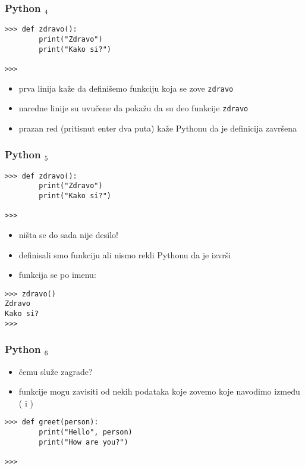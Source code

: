 \documentclass[utf8,compress]{beamer}
\begin{document}
\begin{frame}[fragile]
\frametitle{Python $_4$}
\begin{verbatim}
>>> def zdravo():
        print("Zdravo")
        print("Kako si?")
        
>>>
\end{verbatim}
\begin{itemize}
  \item prva linija kaže da definišemo funkciju koja se zove \texttt{zdravo}
  \item naredne linije su uvučene da pokažu da su deo funkcije \texttt{zdravo}
  \item prazan red (pritisnut enter dva puta) kaže Pythonu da je definicija završena
\end{itemize}
\end{frame}

\begin{frame}[fragile]
\frametitle{Python $_5$}
\begin{verbatim}
>>> def zdravo():
        print("Zdravo")
        print("Kako si?")
        
>>>
\end{verbatim}
\begin{itemize}
  \item ništa se do sada nije desilo!
  \item definisali smo funkciju ali nismo rekli Pythonu da je izvrši
  \item funkcija se  po imenu:
\end{itemize}
\begin{verbatim}
>>> zdravo()
Zdravo
Kako si?
>>>
\end{verbatim}
\end{frame}

\begin{frame}[fragile]
\frametitle{Python $_6$}
\begin{itemize}
  \item čemu služe zagrade?
  \item funkcije mogu zavisiti od nekih podataka koje zovemo  koje navodimo između ( i )
\end{itemize}
\begin{verbatim}
>>> def greet(person):
        print("Hello", person)
        print("How are you?")

>>>
\end{verbatim}
\end{frame}
\end{document}

